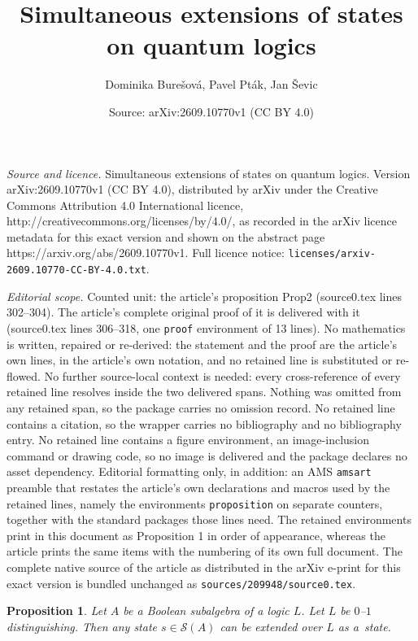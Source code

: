\documentclass[10pt,a4paper]{amsart}
\title{Simultaneous extensions of states on quantum logics}
\author{Dominika Bure\v{s}ov\'{a}, Pavel Pt\'{a}k, Jan \v{S}evic}
\date{Source: arXiv:2609.10770v1 (CC BY 4.0)}
\newtheorem{proposition}{Proposition}
\begin{document}
\maketitle

\noindent\emph{Source and licence.} Simultaneous extensions of states on quantum logics. Version arXiv:2609.10770v1 (CC BY 4.0), distributed by arXiv under the Creative Commons Attribution 4.0 International licence, http://creativecommons.org/licenses/by/4.0/, as recorded in the arXiv licence metadata for this exact version and shown on the abstract page https://arxiv.org/abs/2609.10770v1. Full licence notice: \texttt{licenses/arxiv-2609.10770-CC-BY-4.0.txt}.\par\smallskip

\noindent\textit{Editorial scope.} Counted unit: the article's proposition Prop2 (source0.tex lines 302--304). The article's complete original proof of it is delivered with it (source0.tex lines 306--318, one \texttt{proof} environment of 13 lines). No mathematics is written, repaired or re-derived: the statement and the proof are the article's own lines, in the article's own notation, and no retained line is substituted or re-flowed.  No further source-local context is needed: every cross-reference of every retained line resolves inside the two delivered spans.  Nothing was omitted from any retained span, so the package carries no omission record.  No retained line contains a citation, so the wrapper carries no bibliography and no bibliography entry.  No retained line contains a figure environment, an image-inclusion command or drawing code, so no image is delivered and the package declares no asset dependency.  Editorial formatting only, in addition: an AMS \texttt{amsart} preamble that restates the article's own declarations and macros used by the retained lines, namely the environments \texttt{proposition} on separate counters, together with the standard packages those lines need.  The retained environments print in this document as Proposition 1 in order of appearance, whereas the article prints the same items with the numbering of its own full document.  The complete native source of the article as distributed in the arXiv e-print for this exact version is bundled unchanged as \texttt{sources/209948/source0.tex}.
\begin{proposition}\label{Prop2}
Let $A$ be a Boolean subalgebra of a logic $L$. Let $L$ be $0$--$1$ distinguishing. Then any state $s\in \mathcal{S}(A)$ can be extended over $L$ as a~state.
\end{proposition}
\end{document}
